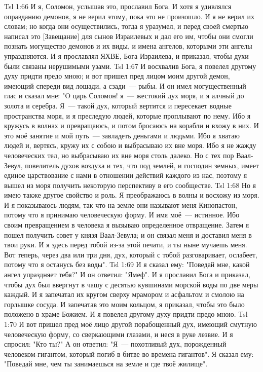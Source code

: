 \vs Tsl 1:66 
И я, Соломон, услышав это, прославил Бога. И хотя я удивлялся оправданию демонов, я не верил этому, пока это не произошло. И я не верил их словам; но когда они осуществились, тогда я уразумел, и перед своей смертью написал это [Завещание] для сынов Израилевых и дал его им, чтобы они смогли познать могущество демонов и их виды, и имена ангелов, которыми эти ангелы упраздняются. И я прославлял ЯХВЕ, Бога Израилева, и приказал, чтобы духи были связаны нерушимыми узами.
\vs Tsl 1:67 
И восхвалив Бога, я повелел другому духу придти предо мною; и вот пришел пред лицом моим другой демон, имеющий спереди вид лошади, а сзади~--- рыбы. И он имел могущественный глас и сказал мне: "O царь Соломон! я~--- жестокий дух моря, и я алчный до золота и серебра. Я~--- такой дух, который вертится и пересекает водные пространства моря, и я преследую людей, которые проплывают по нему. Ибо я кружусь в волнах и превращаюсь, и потом бросаюсь на корабли и вхожу в них. И это моё занятие и мой путь~--- завладеть деньгами и людьми. Ибо я хватаю людей и, вертясь, кружу их с собою и выбрасываю их вне моря. Ибо я не жажду человеческих тел, но выбрасываю их вне моря столь далеко. Но с тех пор Ваал-Зевул, повелитель духов воздуха и тех, что под землей, и господин земных, имеет единое царствование с нами в отношении действий каждого из нас, поэтому я вышел из моря получить некоторую перспективу в его сообществе.
\vs Tsl 1:68 
Но я имею также другое свойство и роль. Я преображаюсь в волны и восхожу из моря. И я показываюсь людям, так что на земле они называют меня Кинопастон, потому что я принимаю человеческую форму. И имя моё~--- истинное. Ибо своим превращением в человека я вызываю определенное отвращение. Затем я пошел получить совет у князя Ваал-Зевула; и он связал меня и доставил меня в твои руки. И я здесь перед тобой из-за этой печати, и ты ныне мучаешь меня. Вот теперь, через два или три дня, дух, который с тобой разговаривает, ослабеет, потому что я останусь без воды".
\vs Tsl 1:69 
И я сказал ему: "Поведай мне, какой ангел упраздняет тебя?" И он ответил: "Ямеф". И я прославил Бога и приказал, чтобы дух был ввергнут в чашу с десятью кувшинами морской воды по две меры каждый. И я запечатал их кругом сверху мрамором и асфальтом и смолою на горлышке сосуда. И запечатав это моим кольцом, я приказал, чтобы это было положено в храме Божием. И я повелел другому духу придти предо мною.
\vs Tsl 1:70 
И вот пришел пред моё лицо другой порабощенный дух, имеющий смутную человеческую форму, со сверкающими глазами, и неся в руке лезвие. И я спросил: "Кто ты?" А он ответил: "Я~--- похотливый дух, порожденный человеком-гигантом, который погиб в битве во времена гигантов". Я сказал ему: "Поведай мне, чем ты занимаешься на земле и где твоё жилище".
